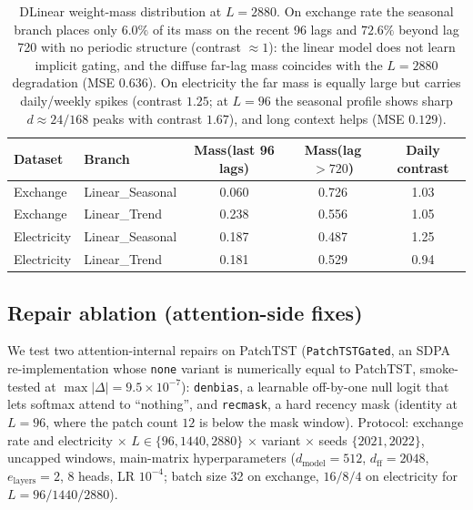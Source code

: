 \begin{table}[t]
\caption{DLinear weight-mass distribution at $L{=}2880$. On exchange rate the seasonal branch places only $6.0\%$ of its mass on the recent 96 lags and $72.6\%$ beyond lag 720 with no periodic structure (contrast $\approx 1$): the linear model does not learn implicit gating, and the diffuse far-lag mass coincides with the $L{=}2880$ degradation (MSE $0.636$). On electricity the far mass is equally large but carries daily/weekly spikes (contrast $1.25$; at $L{=}96$ the seasonal profile shows sharp $d{\approx}24/168$ peaks with contrast $1.67$), and long context helps (MSE $0.129$).}
\label{tab:dlinear}
\centering\small
\begin{tabular}{llccc}
\toprule
Dataset & Branch & Mass(last 96 lags) & Mass(lag $> 720$) & Daily contrast \\
\midrule
Exchange & Linear\_Seasonal & 0.060 & 0.726 & 1.03 \\
Exchange & Linear\_Trend & 0.238 & 0.556 & 1.05 \\
Electricity & Linear\_Seasonal & 0.187 & 0.487 & 1.25 \\
Electricity & Linear\_Trend & 0.181 & 0.529 & 0.94 \\
\bottomrule
\end{tabular}
\end{table}

\subsection{Repair ablation (attention-side fixes)}

We test two attention-internal repairs on PatchTST (\texttt{PatchTSTGated}, an SDPA re-implementation whose \texttt{none} variant is numerically equal to PatchTST, smoke-tested at $\max|\Delta| = 9.5{\times}10^{-7}$): \texttt{denbias}, a learnable off-by-one null logit that lets softmax attend to ``nothing'', and \texttt{recmask}, a hard recency mask (identity at $L{=}96$, where the patch count $12$ is below the mask window). Protocol: exchange rate and electricity $\times$ $L \in \{96, 1440, 2880\}$ $\times$ variant $\times$ seeds $\{2021, 2022\}$, uncapped windows, main-matrix hyperparameters ($d_{\mathrm{model}}{=}512$, $d_{\mathrm{ff}}{=}2048$, $e_{\mathrm{layers}}{=}2$, 8 heads, LR $10^{-4}$; batch size 32 on exchange, $16/8/4$ on electricity for $L = 96/1440/2880$).

